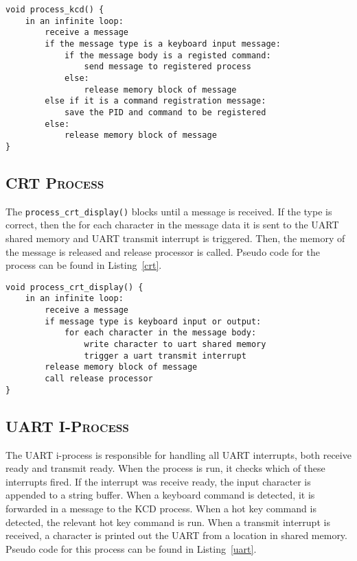 \documentclass[oneside]{report}
\begin{document}
\begin{lstlisting}
void process_kcd() {
    in an infinite loop:
        receive a message
        if the message type is a keyboard input message:
            if the message body is a registed command:
                send message to registered process
            else:
                release memory block of message
        else if it is a command registration message:
            save the PID and command to be registered
        else:
            release memory block of message
}
\end{lstlisting}

\subsection{\textsc{CRT Process}}
The \texttt{process\_crt\_display()} blocks until a message is
received. If the type is correct, then the for each character in the message 
data it is sent to the UART shared memory and UART transmit interrupt is 
triggered. Then, the memory of the message is released and release processor is 
called. Pseudo code for the process can be found in Listing~\ref{crt}.

\begin{lstlisting}
void process_crt_display() {
    in an infinite loop:
        receive a message
        if message type is keyboard input or output:
            for each character in the message body:
                write character to uart shared memory
                trigger a uart transmit interrupt
        release memory block of message
        call release processor
}
\end{lstlisting}

\subsection{\textsc{UART I-Process}}

The UART i-process is responsible for handling all UART interrupts,
both receive ready and transmit ready. When the process is run, it
checks which of these interrupts fired. If the interrupt was receive
ready, the input character is appended to a string buffer. When a
keyboard command is detected, it is forwarded in a message to the KCD
process. When a hot key command is detected, the relevant hot key
command is run. When a transmit interrupt is received, a character is
printed out the UART from a location in shared memory. Pseudo code for
this process can be found in Listing~\ref{uart}.
\end{document}
